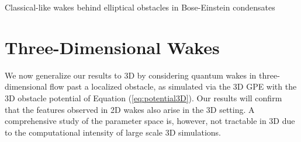 \begin{chapter}{\label{cha:wake}Classical-like wakes behind elliptical obstacles in Bose-Einstein condensates}

\section{Three-Dimensional Wakes}
We now generalize our results to 3D by considering quantum wakes in three-dimensional flow past a localized obstacle, as simulated via the 3D GPE with the 3D obstacle potential of Equation (\ref{eq:potential3D}).  Our results will confirm that the features observed in 2D wakes also arise in the 3D setting.  A comprehensive study of the parameter space is, however, not tractable in 3D due to the computational intensity of large scale 3D simulations.




\end{chapter}
